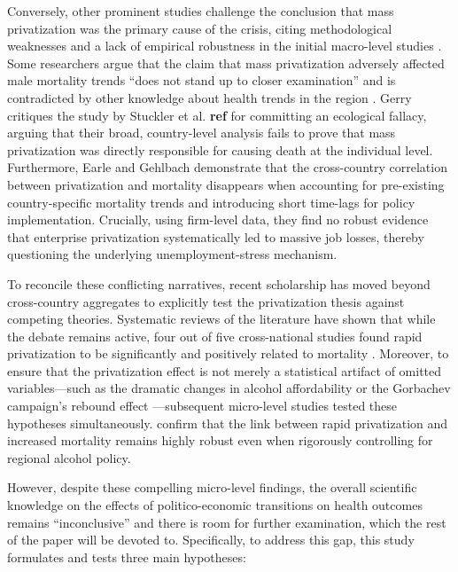 \documentclass[12pt]{article}
\begin{document}
Conversely, other prominent studies challenge the conclusion that mass privatization was the primary cause of the crisis, citing methodological weaknesses and a lack of empirical 
robustness in the initial macro-level studies \citep{Earle2010, Gerry2012}. Some researchers argue that the claim that mass privatization adversely affected male mortality trends ``does not stand up to 
closer examination'' and is contradicted by other knowledge about health trends in the region \citep{Earle2010}. Gerry \citep{Gerry2012} critiques the study by Stuckler et al. \textbf{ref} for committing an 
ecological fallacy, arguing that their broad, country-level analysis fails to prove that mass privatization was directly responsible for causing death at the individual level. 
Furthermore, Earle and Gehlbach \citep{Earle2013} demonstrate that the cross-country correlation between privatization and mortality disappears when accounting for pre-existing country-specific mortality trends 
and introducing short time-lags for policy implementation. Crucially, using firm-level data, they find no robust evidence that enterprise privatization systematically led 
to massive job losses, thereby questioning the underlying unemployment-stress mechanism.

To reconcile these conflicting narratives, recent scholarship has moved beyond cross-country aggregates to explicitly test the privatization thesis against competing theories. Systematic reviews 
of the literature have shown that while the debate remains active, four out of five cross-national studies found rapid privatization to be significantly and positively related to mortality 
\citep{Scheiring2019}. Moreover, to ensure that the privatization effect is not merely a statistical artifact of omitted variables—such as the dramatic changes in alcohol affordability 
\citep{Treisman2010} or the Gorbachev campaign's rebound effect \citep{Bhattacharya2013}—subsequent micro-level studies tested these hypotheses simultaneously. \citet{Azarova2019} confirm that the link between rapid privatization and increased mortality remains highly robust even when rigorously controlling for regional alcohol policy. 

However, despite these compelling micro-level findings, the overall scientific knowledge on the effects of politico-economic transitions on health outcomes remains ``inconclusive'' and there 
 is room for further examination, which the rest of the paper will be devoted to. Specifically, to address this gap, this study formulates and tests three main hypotheses:
\end{document}
